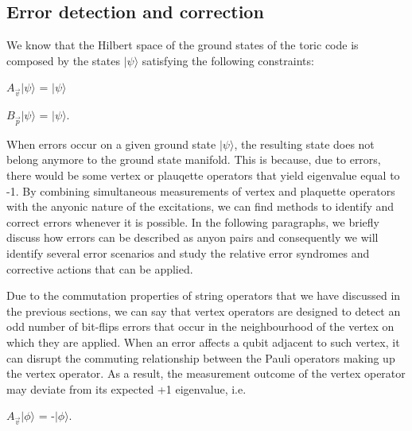 \documentclass{Configuration_Files/PoliMi3i_thesis}
\begin{document}
\subsection{Error detection and correction}

We know that the Hilbert space of the ground states of the toric code is composed by the states $|\psi\rangle $ satisfying the following constraints: 

\begin{center}
	$A_{\vec{v}}|\psi\rangle $ = $|\psi\rangle $ 
\end{center}
\begin{center}
	$B_{\vec{p}}|\psi\rangle $ = $|\psi\rangle $.
\end{center}

When errors occur on a given ground state $|\psi\rangle$, the resulting state does not belong anymore to the ground state manifold. This is because, due to errors, there would be some vertex or plauqette operators that yield eigenvalue equal to -1. \newline
By combining simultaneous measurements of vertex and plaquette operators with the anyonic nature of the excitations, we can find methods to identify and correct errors whenever it is possible. In the following paragraphs, we briefly discuss how errors can be described as anyon pairs and consequently we will identify several error scenarios and study the relative error syndromes and corrective actions that can be applied. \newline

Due to the commutation properties of string operators that we have discussed in the previous sections, we can say that vertex operators are designed to detect an odd number of bit-flips errors that occur in the neighbourhood of the vertex on which they are applied. When an error affects a qubit adjacent to such vertex, it can disrupt the commuting relationship between the Pauli operators making up the vertex operator. As a result, the measurement outcome of the vertex operator may deviate from its expected +1 eigenvalue, i.e.

\begin{center}
	$A_{\vec{v}}|\phi\rangle $ = -$|\phi\rangle $.
\end{center}
\end{document}
